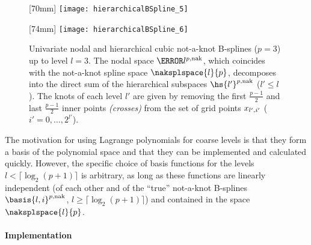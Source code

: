 \begin{figure}
  [70mm]{%
    \texttt{[image: hierarchicalBSpline\_5]}%
  }%
  \hfill%
  \hfill%
  [74mm]{%
    \texttt{[image: hierarchicalBSpline\_6]}%
  }%
  \caption{%
    Univariate nodal and hierarchical cubic not-a-knot B-splines ($p = 3$)
    up to level $l = 3$.
    The nodal space $\ns{l}^{p,\notaknot}$,
    which coincides with the not-a-knot spline space $\naksplspace{l}{p}$,
    decomposes into the direct sum
    of the hierarchical subspaces $\hs{l'}^{p,\notaknot}$ ($l' \le l$).
    The knots of each level $l'$ are given by removing the
    first $\tfrac{p-1}{2}$ and last $\tfrac{p-1}{2}$
    inner points \emph{(crosses)}
    from the set of grid points $x_{l',i'}$
    ($i' = 0, \dotsc, 2^{l'}$).%
  }%
  \label{fig:notAKnotBSpline}%
\end{figure}

The motivation for using Lagrange polynomials for coarse levels
is that they form a basis of the polynomial space
and that they can be implemented and calculated quickly.
However, the specific choice of basis functions for the levels
$l < \lceil\log_2(p + 1)\rceil$ is arbitrary,
as long as these functions are linearly independent
(of each other and of the ``true'' not-a-knot B-splines
$\basis{l,i}^{p,\notaknot}$, $l \ge \lceil\log_2(p+1)\rceil$)
and contained in the space $\naksplspace{l}{p}$.

\paragraph{Implementation}

